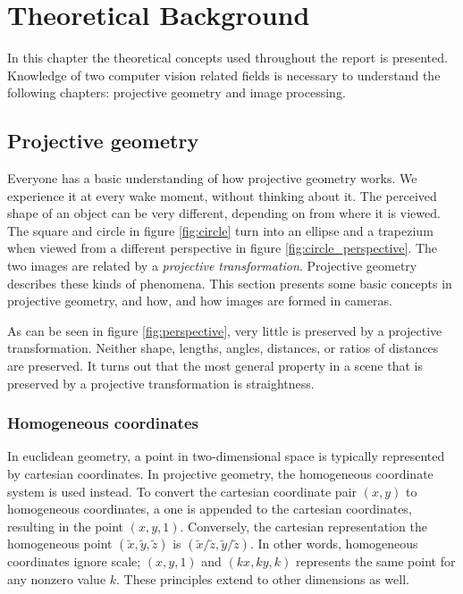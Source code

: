 \chapter{Theoretical Background}

In this chapter the theoretical concepts used throughout the report is presented. Knowledge of two computer vision related fields is necessary to understand the following chapters: projective geometry and image processing.

\section{Projective geometry}
Everyone has a basic understanding of how projective geometry works.
We experience it at every wake moment, without thinking about it. 
The perceived shape of an object can be very different, depending on from where it is viewed.
The square and circle in figure \ref{fig:circle} turn into an ellipse and a trapezium when viewed from a different perspective in figure \ref{fig:circle_perspective}.
The two images are related by a \textit{projective transformation}.
Projective geometry describes these kinds of phenomena.
This section presents some basic concepts in projective geometry, and how, and how images are formed in cameras.



As can be seen in figure \ref{fig:perspective}, very little is preserved by a projective transformation.
Neither shape, lengths, angles, distances, or ratios of distances are preserved.
It turns out that the most general property in a scene that is preserved by a projective transformation is straightness. \cite[1]{hartley-zisserman}

\subsection{Homogeneous coordinates}

In euclidean geometry, a point in two-dimensional space is typically represented by cartesian coordinates.
In projective geometry, the homogeneous coordinate system is used instead.
To convert the cartesian coordinate pair $(x,y)$ to homogeneous coordinates, a one is appended to the cartesian coordinates, resulting in the point $(x,y,1)$. 
Conversely, the cartesian representation the homogeneous point $(\tilde{x},\tilde{y},\tilde{z})$ is $(\tilde{x}/\tilde{z},\tilde{y}/\tilde{z})$. 
In other words, homogeneous coordinates ignore scale; $(x,y,1)$ and $(kx,ky,k)$ represents the same point for any nonzero value $k$.
These principles extend to other dimensions as well. \cite[2]{hartley-zisserman}

